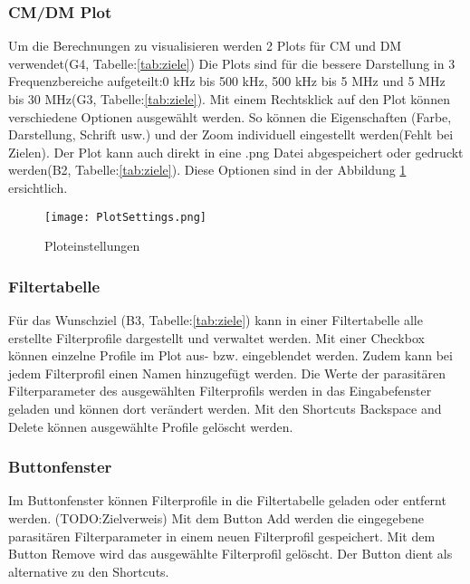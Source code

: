 \subsubsection{CM/DM Plot} \label{subsubsec:CM_DMplot}

Um die Berechnungen zu visualisieren werden 2 Plots für CM und DM verwendet(G4, Tabelle:\ref{tab:ziele}) Die Plots sind für die bessere Darstellung in 3 Frequenzbereiche aufgeteilt:0 kHz bis 500 kHz, 500 kHz bis 5 MHz und 5 MHz bis 30 MHz(G3, Tabelle:\ref{tab:ziele}). Mit einem Rechtsklick auf den Plot können verschiedene Optionen ausgewählt werden. So können die Eigenschaften (Farbe, Darstellung, Schrift usw.) und der Zoom individuell eingestellt werden(Fehlt bei Zielen). Der Plot kann auch direkt in eine .png Datei abgespeichert oder gedruckt werden(B2, Tabelle:\ref{tab:ziele}). Diese Optionen sind in der Abbildung \ref{fig:PlotSettings} ersichtlich.

\begin{figure}[H]
	\centering
	\texttt{[image: PlotSettings.png]}
	\caption{Ploteinstellungen}
	\label{fig:PlotSettings}
\end{figure} 


\subsubsection{Filtertabelle} \label{subsubsec:filtertabelle}

Für das Wunschziel (B3, Tabelle:\ref{tab:ziele}) kann in einer Filtertabelle alle erstellte Filterprofile dargestellt und verwaltet werden.  Mit einer Checkbox können einzelne Profile im Plot aus- bzw. eingeblendet werden. Zudem kann bei jedem Filterprofil einen Namen hinzugefügt werden. Die Werte der parasitären Filterparameter des ausgewählten Filterprofils werden in das Eingabefenster geladen und können dort verändert werden. Mit den Shortcuts Backspace and Delete können ausgewählte Profile gelöscht werden.

\subsubsection{Buttonfenster} \label{subsubsec:buttonfenster}

Im Buttonfenster können Filterprofile in die Filtertabelle geladen oder entfernt werden. (TODO:Zielverweis) Mit dem Button Add werden die eingegebene parasitären Filterparameter in einem neuen Filterprofil gespeichert. Mit dem Button Remove wird das ausgewählte Filterprofil gelöscht. Der Button dient als alternative zu den Shortcuts.



